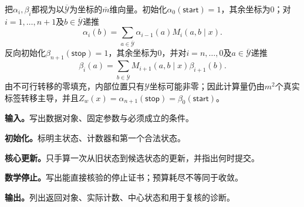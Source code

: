 把$\alpha_i,\beta_i$都视为以$\overline{\mathcal Y}$为坐标的$\bar m$维向量。初始化$\alpha_0(\mathsf{start})=1$，其余坐标为0；对$i=1,\ldots,n+1$及$b\in\overline{\mathcal Y}$递推
\[
\alpha_i(b)=\sum_{a\in\overline{\mathcal Y}}\alpha_{i-1}(a)M_i(a,b\mid x).
\]
反向初始化$\beta_{n+1}(\mathsf{stop})=1$，其余坐标为0，并对$i=n,\ldots,0$及$a\in\overline{\mathcal Y}$递推
\[
\beta_i(a)=\sum_{b\in\overline{\mathcal Y}}M_{i+1}(a,b\mid x)\beta_{i+1}(b).
\]
由不可行转移的零填充，内部位置只有$\mathcal Y$坐标可能非零；因此计算量仍由$m^2$个真实标签转移主导，并且$Z_w(x)=\alpha_{n+1}(\mathsf{stop})=\beta_0(\mathsf{start})$。

\label{struct:V3-C06-CH19}
\label{struct:V3-C06-CH20}

\begin{keypointbox}[title={线性链CRF的BFGS学习：五步阅读}]
\textbf{输入。}写出数据对象、固定参数与必须成立的条件。\par
\textbf{初始化。}标明主状态、计数器和第一个合法状态。\par
\textbf{核心更新。}只手算一次从旧状态到候选状态的更新，并指出何时提交。\par
\textbf{数学停止。}写出能直接核验的停止证书；预算耗尽不等同于收敛。\par
\textbf{输出。}列出返回对象、实际计数、中心状态和用于复核的诊断。
\end{keypointbox}

